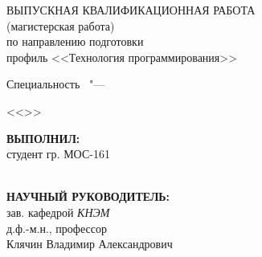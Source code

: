 %
\begin{center}
\textbf { %
\thesisTitle}

{%
ВЫПУСКНАЯ КВАЛИФИКАЦИОННАЯ РАБОТА \\ (магистерская работа) \\ по направлению подготовки  \thesisSpecialtyNumber\ \thesisSpecialtyTitle \\ профиль <<Технология программирования>>
}

\ifdefined\thesisSpecialtyTwoNumber
{%
Специальность \thesisSpecialtyTwoNumber\ "---

<<\thesisSpecialtyTwoTitle>>
}
\fi

\vspace{0pt plus2fill} %

\hfill\begin{minipage}{0.55\textwidth}
			\textbf{ВЫПОЛНИЛ:} \\
			студент гр. МОС-161 \\
			\thesisAuthorLastName\ \thesisAuthorOtherNames \\
			\underline{\hspace{\textwidth}}
		\end{minipage}
%

\vspace{0pt plus1fill} %

\hfill\begin{minipage}{0.55\textwidth}
			\textbf{НАУЧНЫЙ РУКОВОДИТЕЛЬ:} \\
			зав. кафедрой \textit{КНЭМ} \\
			д.ф.-м.н., профессор \\
			Клячин Владимир Александрович \\
			\underline{\hspace{\textwidth}}
		\end{minipage}
%


\end{center}
